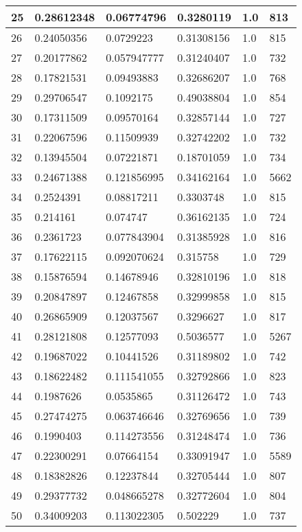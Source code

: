 \begin{longtable}{|l|l|l|l|l|l|}
25 & 0.28612348 & 0.06774796 & 0.3280119 & 1.0 & 813 \\ \hline 
26 & 0.24050356 & 0.0729223 & 0.31308156 & 1.0 & 815 \\ \hline 
27 & 0.20177862 & 0.057947777 & 0.31240407 & 1.0 & 732 \\ \hline 
28 & 0.17821531 & 0.09493883 & 0.32686207 & 1.0 & 768 \\ \hline 
29 & 0.29706547 & 0.1092175 & 0.49038804 & 1.0 & 854 \\ \hline 
30 & 0.17311509 & 0.09570164 & 0.32857144 & 1.0 & 727 \\ \hline 
31 & 0.22067596 & 0.11509939 & 0.32742202 & 1.0 & 732 \\ \hline 
32 & 0.13945504 & 0.07221871 & 0.18701059 & 1.0 & 734 \\ \hline 
33 & 0.24671388 & 0.121856995 & 0.34162164 & 1.0 & 5662 \\ \hline 
34 & 0.2524391 & 0.08817211 & 0.3303748 & 1.0 & 815 \\ \hline 
35 & 0.214161 & 0.074747 & 0.36162135 & 1.0 & 724 \\ \hline 
36 & 0.2361723 & 0.077843904 & 0.31385928 & 1.0 & 816 \\ \hline 
37 & 0.17622115 & 0.092070624 & 0.315758 & 1.0 & 729 \\ \hline 
38 & 0.15876594 & 0.14678946 & 0.32810196 & 1.0 & 818 \\ \hline 
39 & 0.20847897 & 0.12467858 & 0.32999858 & 1.0 & 815 \\ \hline 
40 & 0.26865909 & 0.12037567 & 0.3296627 & 1.0 & 817 \\ \hline 
41 & 0.28121808 & 0.12577093 & 0.5036577 & 1.0 & 5267 \\ \hline 
42 & 0.19687022 & 0.10441526 & 0.31189802 & 1.0 & 742 \\ \hline 
43 & 0.18622482 & 0.111541055 & 0.32792866 & 1.0 & 823 \\ \hline 
44 & 0.1987626 & 0.0535865 & 0.31126472 & 1.0 & 743 \\ \hline 
45 & 0.27474275 & 0.063746646 & 0.32769656 & 1.0 & 739 \\ \hline 
46 & 0.1990403 & 0.114273556 & 0.31248474 & 1.0 & 736 \\ \hline 
47 & 0.22300291 & 0.07664154 & 0.33091947 & 1.0 & 5589 \\ \hline 
48 & 0.18382826 & 0.12237844 & 0.32705444 & 1.0 & 807 \\ \hline 
49 & 0.29377732 & 0.048665278 & 0.32772604 & 1.0 & 804 \\ \hline 
50 & 0.34009203 & 0.113022305 & 0.502229 & 1.0 & 737 \\ \hline 
\end{longtable}